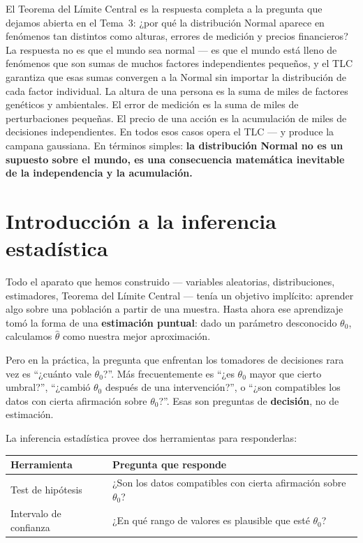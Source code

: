 \documentclass[12pt, a4paper]{book}
\numberwithin{equation}{chapter}
\begin{document}
El Teorema del L\'{i}mite Central es la respuesta
completa a la pregunta que dejamos abierta en el
Tema~3: ¿por qu\'{e} la distribuci\'{o}n Normal
aparece en fen\'{o}menos tan distintos como alturas,
errores de medici\'{o}n y precios financieros? La
respuesta no es que el mundo sea normal --- es que
el mundo est\'{a} lleno de fen\'{o}menos que son
sumas de muchos factores independientes peque\~{n}os,
y el TLC garantiza que esas sumas convergen a la
Normal sin importar la distribuci\'{o}n de cada
factor individual. La altura de una persona es la
suma de miles de factores gen\'{e}ticos y ambientales.
El error de medici\'{o}n es la suma de miles de
perturbaciones peque\~{n}as. El precio de una acci\'{o}n
es la acumulaci\'{o}n de miles de decisiones
independientes. En todos esos casos opera el TLC ---
y produce la campana gaussiana. En t\'{e}rminos
simples: \textbf{la distribuci\'{o}n Normal no es
	un supuesto sobre el mundo, es una consecuencia
	matem\'{a}tica inevitable de la independencia y
	la acumulaci\'{o}n.}

\chapter{Introducci\'{o}n a la inferencia estad\'{i}stica}

Todo el aparato que hemos construido --- variables
aleatorias, distribuciones, estimadores, Teorema del
L\'{i}mite Central --- ten\'{i}a un objetivo impl\'{i}cito:
aprender algo sobre una poblaci\'{o}n a partir de una
muestra. Hasta ahora ese aprendizaje tom\'{o} la forma
de una \textbf{estimaci\'{o}n puntual}: dado un par\'{a}metro
desconocido $\theta_0$, calculamos $\hat{\theta}$ como
nuestra mejor aproximaci\'{o}n.

Pero en la pr\'{a}ctica, la pregunta que enfrentan los
tomadores de decisiones rara vez es ``¿cu\'{a}nto vale
$\theta_0$?''. M\'{a}s frecuentemente es ``¿es $\theta_0$
mayor que cierto umbral?'', ``¿cambi\'{o} $\theta_0$
despu\'{e}s de una intervenci\'{o}n?'', o ``¿son
compatibles los datos con cierta afirmaci\'{o}n sobre
$\theta_0$?''. Esas son preguntas de \textbf{decisi\'{o}n},
no de estimaci\'{o}n.

La inferencia estad\'{i}stica provee dos herramientas
para responderlas:

\begin{center}
	\begin{tabular}{ll}
		\toprule
		\textbf{Herramienta} & \textbf{Pregunta que responde} \\
		\midrule
		Test de hip\'{o}tesis &
		¿Son los datos compatibles con cierta afirmaci\'{o}n
		sobre $\theta_0$? \\[4pt]
		Intervalo de confianza &
		¿En qu\'{e} rango de valores es plausible que
		est\'{e} $\theta_0$? \\
		\bottomrule
	\end{tabular}
\end{center}
\end{document}
